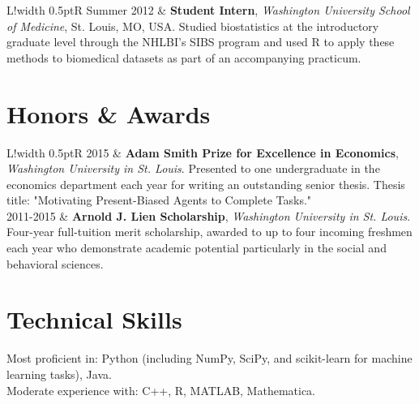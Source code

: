 \documentclass[10pt]{article}
\newcommand\VRule{\color{lightgray}\vrule width 0.5pt}
\begin{document}
\begin{tabular}{L!{\VRule}R}
Summer 2012 & {\textbf{Student Intern}, \emph{Washington University School of Medicine}, St. Louis, MO, USA}.
\newline
Studied biostatistics at the introductory graduate level through the NHLBI's SIBS program and used R to apply these methods to biomedical datasets as part of an accompanying practicum.  
\end{tabular}

\section*{Honors \& Awards}
\begin{tabular}{L!{\VRule}R}
2015 & \textbf{Adam Smith Prize for Excellence in Economics}, \emph{Washington University in St. Louis}.
\newline Presented to one undergraduate in the economics department each year for writing an outstanding senior thesis.  Thesis title: "Motivating Present-Biased Agents to Complete Tasks."
\\

2011-2015 & \textbf{Arnold J. Lien Scholarship}, \emph{Washington University in St. Louis}.
\newline Four-year full-tuition merit scholarship, awarded to up to four incoming freshmen each year who demonstrate academic potential particularly in the social and behavioral sciences.  
\\
\end{tabular}

\section*{Technical Skills}
Most proficient in: Python (including NumPy, SciPy, and scikit-learn for machine learning tasks), Java.  \\
Moderate experience with: C++, R, MATLAB, Mathematica. \\
\end{document}
